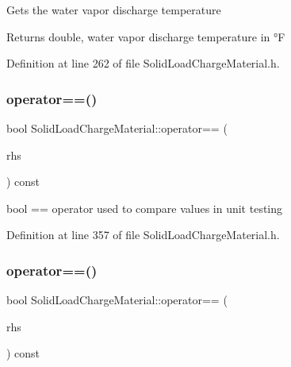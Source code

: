 Gets the water vapor discharge temperature \begin{DoxyReturn}{Returns}
double, water vapor discharge temperature in °F 
\end{DoxyReturn}


Definition at line 262 of file Solid\+Load\+Charge\+Material.\+h.

\mbox{\label{class_solid_load_charge_material_aacf2f41ce38067a52fb7d8456a05a699}} 
\subsubsection{\texorpdfstring{operator==()}{operator==()}\hspace{0.1cm}{\footnotesize\ttfamily [1/3]}}
{\footnotesize\ttfamily bool Solid\+Load\+Charge\+Material\+::operator== (\begin{DoxyParamCaption}\item[{const \hyperlink{class_solid_load_charge_material}{Solid\+Load\+Charge\+Material} \&}]{rhs }\end{DoxyParamCaption}) const\hspace{0.3cm}{\ttfamily [inline]}}

bool == operator used to compare values in unit testing 

Definition at line 357 of file Solid\+Load\+Charge\+Material.\+h.

\mbox{\label{class_solid_load_charge_material_aacf2f41ce38067a52fb7d8456a05a699}} 
\subsubsection{\texorpdfstring{operator==()}{operator==()}\hspace{0.1cm}{\footnotesize\ttfamily [2/3]}}
{\footnotesize\ttfamily bool Solid\+Load\+Charge\+Material\+::operator== (\begin{DoxyParamCaption}\item[{const \hyperlink{class_solid_load_charge_material}{Solid\+Load\+Charge\+Material} \&}]{rhs }\end{DoxyParamCaption}) const\hspace{0.3cm}{\ttfamily [inline]}}

